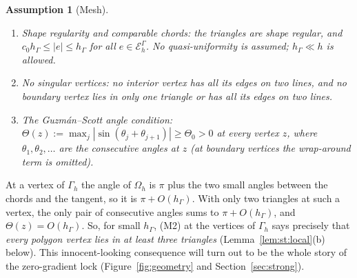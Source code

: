 \documentclass[pdflatex,sn-mathphys-num]{sn-jnl}
\theoremstyle{thmstyleone}
\theoremstyle{thmstylethree}
\newtheorem{assumption}[theorem]{Assumption}
\newcommand{\hG}{h_\Gamma}
\newcommand{\Gh}{\Gamma_h}
\newcommand{\Oh}{\Omega_h}
\newcommand{\EG}{\mathcal E_h^\Gamma}
\begin{document}
\begin{assumption}[Mesh]\label{ass:mesh}\leavevmode
\begin{enumerate}[label=(M\arabic*),start=0]
\item \emph{Shape regularity and comparable chords}: the triangles are shape regular, and $c_0\hG\le|e|\le\hG$ for all $e\in\EG$. No quasi-uniformity is assumed; $\hG\ll h$ is allowed.
\item \emph{No singular vertices}: no interior vertex has all its edges on two lines, and no boundary vertex lies in only one triangle or has all its edges on two lines.
\item \emph{The Guzm\'an--Scott angle condition}: $\Theta(z):=\max_j|\sin(\theta_j+\theta_{j+1})|\ge\Theta_0>0$ at every vertex $z$, where $\theta_1,\theta_2,\dots$ are the consecutive angles at $z$ \cite{GuzmanScott2019} (at boundary vertices the wrap-around term is omitted).
\end{enumerate}
\end{assumption}
At a vertex of $\Gh$ the angle of $\Oh$ is $\pi$ plus the two small angles between the chords and the tangent, so it is $\pi+O(\hG)$. With only two triangles at such a vertex, the only pair of consecutive angles sums to $\pi+O(\hG)$, and $\Theta(z)=O(\hG)$. So, for small $\hG$, (M2) at the vertices of $\Gh$ says precisely that \emph{every polygon vertex lies in at least three triangles} (Lemma~\ref{lem:st:local}(b) below). This innocent-looking consequence will turn out to be the whole story of the zero-gradient lock (Figure~\ref{fig:geometry} and Section~\ref{sec:strong}).
\end{document}
